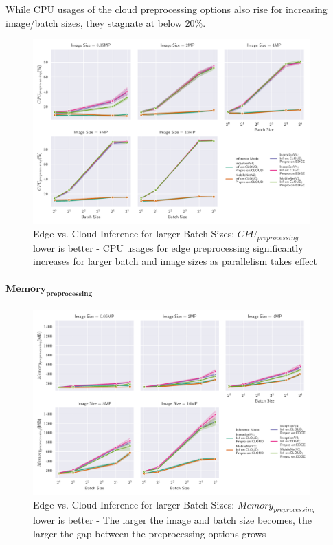 While CPU usages of the cloud preprocessing options also rise for increasing image/batch sizes, they stagnate at below $20\%$.
\begin{figure}[!htb]
\centering
\includegraphics[width=0.95\textwidth]{./Bilder/single_plots/batch_size_plots/Effects_of_Batch_size_Preprocessing_CPU_Usage.pdf}
\caption[Edge vs. Cloud Inference for larger Batch Sizes:  $CPU_{preprocessing}$ - lower is better]{Edge vs. Cloud Inference for larger Batch Sizes:  $CPU_{preprocessing}$ - lower is better - CPU usages for edge preprocessing significantly increases for larger batch and image sizes as parallelism takes effect }
\label{fig:BatchSizePreproCPU}
\end{figure}

\paragraph{$\mathbf{Memory_{preprocessing}}$}
\begin{figure}[!htb]
\centering
\includegraphics[width=0.95\textwidth]{./Bilder/single_plots/batch_size_plots/Effects_of_Batch_size_Preprocessing_Memory.pdf}
\caption[Edge vs. Cloud Inference for larger Batch Sizes:  $Memory_{preprocessing}$ - lower is better]{Edge vs. Cloud Inference for larger Batch Sizes:  $Memory_{preprocessing}$ - lower is better - The larger the image and batch size becomes, the larger the gap between the preprocessing options grows}
\label{fig:BatchSizePreproMemory}
\end{figure}

